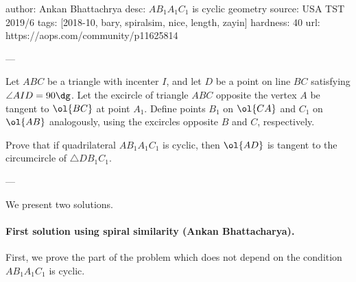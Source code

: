 author: Ankan Bhattachrya
desc: $AB_1A_1C_1$ is cyclic geometry
source: USA TST 2019/6
tags: [2018-10, bary, spiralsim, nice, length, zayin]
hardness: 40
url: https://aops.com/community/p11625814

---

Let $ABC$ be a triangle with incenter $I$,
and let $D$ be a point on line $BC$ satisfying $\angle AID = 90\dg$.
Let the excircle of triangle $ABC$ opposite the vertex $A$
be tangent to $\ol{BC}$ at point $A_1$.
Define points $B_1$ on $\ol{CA}$ and $C_1$ on $\ol{AB}$ analogously,
using the excircles opposite $B$ and $C$, respectively.

Prove that if quadrilateral $AB_1A_1C_1$ is cyclic,
then $\ol{AD}$ is tangent to the circumcircle of $\triangle DB_1C_1$.

---

We present two solutions.
\paragraph{First solution using spiral similarity (Ankan Bhattacharya).}
First, we prove the part of the problem
which does not depend on the condition $A B_1 A_1 C_1$ is cyclic.

